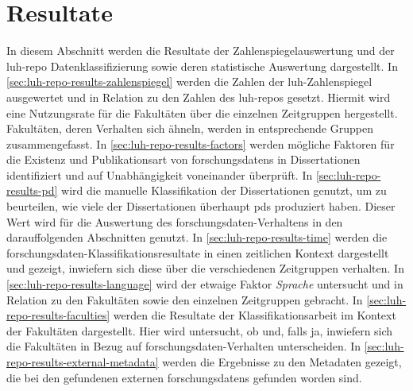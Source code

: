 \section{Resultate}\label{sec:luh-repo-results}
In diesem Abschnitt werden die Resultate der Zahlenspiegelauswertung und der \gls{luh-repo} Datenklassifizierung sowie deren statistische Auswertung dargestellt.
In \cref{sec:luh-repo-results-zahlenspiegel} werden die Zahlen der \gls{luh}-Zahlenspiegel ausgewertet und in Relation zu den Zahlen des \gls{luh-repo}s gesetzt.
Hiermit wird eine Nutzungsrate für die Fakultäten über die einzelnen Zeitgruppen hergestellt.
Fakultäten, deren Verhalten sich ähneln, werden in entsprechende Gruppen zusammengefasst.
In \cref{sec:luh-repo-results-factors} werden mögliche Faktoren für die Existenz und Publikationsart von \glspl{forschungsdaten} in Dissertationen identifiziert und auf Unabhängigkeit voneinander überprüft.
In \cref{sec:luh-repo-results-pd} wird die manuelle Klassifikation der Dissertationen genutzt, um zu beurteilen, wie viele der Dissertationen überhaupt \glspl{pd} produziert haben.
Dieser Wert wird für die Auswertung des \gls{forschungsdaten}-Verhaltens in den darauffolgenden Abschnitten genutzt.
In \cref{sec:luh-repo-results-time} werden die \gls{forschungsdaten}-Klassifikationsresultate in einen zeitlichen Kontext dargestellt und gezeigt, inwiefern sich diese über die verschiedenen Zeitgruppen verhalten.
In \cref{sec:luh-repo-results-language} wird der etwaige Faktor \textit{Sprache} untersucht und in Relation zu den Fakultäten sowie den einzelnen Zeitgruppen gebracht.
In \cref{sec:luh-repo-results-faculties} werden die Resultate der Klassifikationsarbeit im Kontext der Fakultäten dargestellt.
Hier wird untersucht, ob und, falls ja, inwiefern sich  die Fakultäten in Bezug auf \gls{forschungsdaten}-Verhalten unterscheiden.
In \cref{sec:luh-repo-results-external-metadata} werden die Ergebnisse zu den Metadaten gezeigt, die bei den gefundenen externen \glspl{forschungsdaten} gefunden worden sind.


